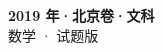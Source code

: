 \documentclass[zihao=-4, a4paper]{ctexart}
\begin{document}
\begin{center}
  {\Large\bfseries 2019 年·北京卷·文科}\\[4pt]
  {\large 数学 · 试题版}
\end{center}
\medskip
{}

\end{document}

